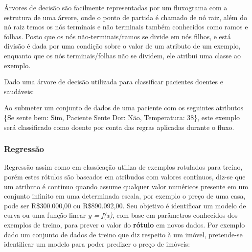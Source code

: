 Árvores de decisão são facilmente representadas por um fluxograma com a estrutura de uma árvore, onde o ponto de partida é chamado de nó raiz,
além do nó raiz temos os nós terminais e não terminais também conhecidos como ramos e folhas. Posto que os nós não-terminais/ramos se divide em nós filhos,
e está divisão é dada por uma condição sobre o valor de um atributo de um exemplo, enquanto que os nós terminais/folhas não se dividem, ele atribui uma classe ao exemplo.

Dado uma árvore de decisão utilizada para classificar pacientes doentes e saudáveis:

\begin{figure}[ht!]
	\centering
\end{figure}

Ao submeter um conjunto de dados de uma paciente com os seguintes atributos \{Se sente bem: Sim, Paciente Sente Dor: Não, Temperatura: 38\}, 
este exemplo será classificado como doente por conta das regras aplicadas durante o fluxo.

\subsubsection{Regressão}
\label{subsubsec{regressao}}
Regressão assim como em classicação utiliza de exemplos rotulados para treino, porém estes rótulos são baseados em atribudos com valores contínuos, 
diz-se que um atributo é contínuo quando assume qualquer valor numéricos presente em um conjunto infinito em uma determinada escala, por exemplo o preço de uma casa, 
pode ser R\$300.000,00 ou R\$890.092,00. Seu objetivo é identificar um modelo de curva ou uma função linear \textit{y = f(x)}, com base
em parâmetros conhecidos dos exemplos de treino, para prever o valor do \textbf{rótulo} em novos dados.
Por exemplo dado um conjunto de dados de treino que diz respeito à um imóvel, pretende-se identificar um modelo para poder predizer
o preço de imóveis:

